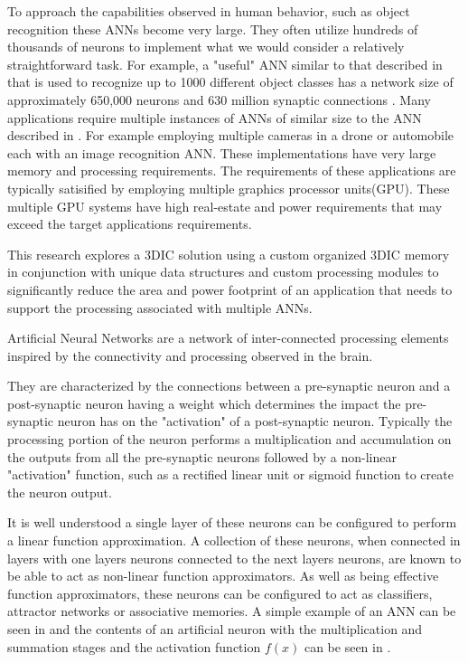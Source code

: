 To approach the capabilities observed in human behavior, such as object recognition these ANNs become very large.
They often utilize hundreds of thousands of neurons to implement what we would consider a relatively straightforward task.
For example, a "useful" ANN similar to that described in \cite{krizhevsky2012imagenet} that is used
to recognize up to 1000 different object classes has a network size of approximately 650,000 neurons and 
630 million synaptic connections \cite{krizhevsky2012imagenetPreso}. 
Many applications require multiple instances of ANNs of similar size to the ANN described in \cite{krizhevsky2012imagenet}.
For example employing multiple cameras in a drone or automobile each with an image recognition ANN\cite{krizhevsky2012imagenet}\cite{bojarski2016end}.
These implementations have very large memory and processing requirements.
The requirements of these applications are typically satisified by employing multiple graphics processor units(GPU).
These multiple GPU systems have high real-estate and power requirements that may exceed the target applications requirements.

This research explores a 3DIC solution using a custom organized 3DIC memory in conjunction with unique data structures and custom processing modules to significantly reduce the 
area and power footprint of an application that needs to support the processing associated with multiple ANNs.


Artificial Neural Networks are a network of inter-connected processing elements inspired by the 
connectivity and processing observed in the brain.

They are characterized by the connections between a pre-synaptic neuron and a post-synaptic
neuron having a weight which determines the impact the pre-synaptic neuron has on the 
"activation" of a post-synaptic neuron.
Typically the processing portion of the neuron performs a multiplication and accumulation on the outputs from all
the pre-synaptic neurons followed by a non-linear "activation" function, such as a rectified linear unit or sigmoid function to create the neuron output.

It is well understood a single layer of these neurons can be configured to perform a linear function approximation.
A collection of these neurons, when connected in layers with one layers neurons connected to
the next layers neurons, are known to be able to act as non-linear function approximators.
As well as being effective function approximators, these neurons can be configured to act as 
classifiers, attractor networks or associative memories.
A simple example of an ANN can be seen in  and the contents of an artificial neuron 
with the multiplication and summation stages and the activation function $f(x)$ can be seen in . 


